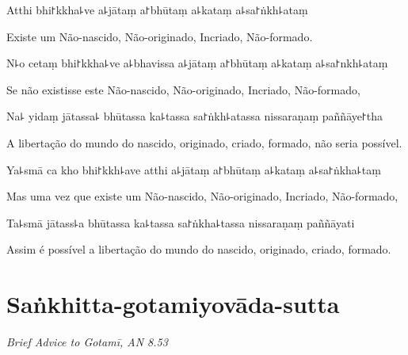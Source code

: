 
\begin{leader}
\end{leader}

Atthi bhi꜓kkha꜕ve a꜕jātaṃ a꜓bhūtaṃ a꜕kataṃ a꜕sa꜓ṅkh꜕ataṃ

\begin{english}
  Existe um Não-nascido, Não-originado, Incriado, Não-formado.
\end{english}

N꜕o cetaṃ bhi꜓kkha꜕ve a꜕bhavissa a꜕jātaṃ a꜓bhūtaṃ a꜕kataṃ a꜕sa꜓nkh꜕ataṃ

\begin{english}
 Se não existisse este Não-nascido, Não-originado, Incriado, Não-formado,
\end{english}

Na꜕ yidaṃ jātassa꜕ bhūtassa ka꜕tassa sa꜓ṅkh꜕atassa nissaraṇaṃ paññāye꜓tha

\begin{english}
  A libertação do mundo do nascido, originado, criado, formado, não seria possível.
\end{english}

Ya꜕smā ca kho bhi꜓kkh꜕ave atthi a꜕jātaṃ a꜓bhūtaṃ a꜕kataṃ a꜕sa꜓ṅkha꜕taṃ

\begin{english}
  Mas uma vez que existe um Não-nascido, Não-originado, Incriado, Não-formado,
\end{english}

Ta꜕smā jātass꜕a bhūtassa ka꜕tassa sa꜓ṅkha꜕tassa nissaraṇaṃ paññāyati

\begin{english}
  Assim é possível a libertação do mundo do nascido, originado, criado, formado.
\end{english}

\chapter[Saṅkhitta-gotamiyovāda-sutta]{Saṅkhitta-gotamiyovāda-sutta}

\emph{Brief Advice to Gotamī, AN 8.53}


\begin{leader}
\end{leader}

